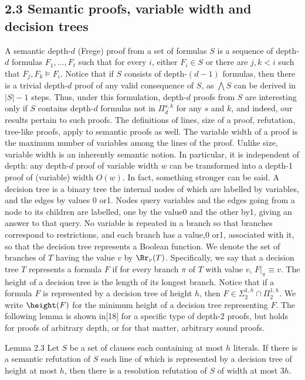 \subsection*{2.3 Semantic proofs, variable width and decision trees}
A semantic depth-$d$ (Frege) proof from a set of formulas $S$ is a sequence of depth-$d$ formulas $F_1,\ldots,F_t$ such that for every $i$, either $F_i\in S$ or there are $j,k<i$ such that $F_j,F_k\models F_i$. Notice that if $S$ consists of depth-$(d-1)$ formulas, then there is a trivial depth-$d$ proof of any valid consequence of $S$, as $\bigwedge S$ can be derived in $|S|-1$ steps. Thus, under this formulation, depth-$d$ proofs from $S$ are interesting only if $S$ contains depth-$d$ formulas not in $\Pi_d^{s,k}$ for any $s$ and $k$, and indeed, our results pertain to such proofs.
The definitions of lines, size of a proof, refutation, tree-like proofs, apply to semantic proofs as well. The variable width of a proof is the maximum number of variables among the lines of the proof.
Unlike size, variable width is an inherently semantic notion. In particular, it is independent of depth: any depth-$d$ proof of variable width $w$ can be transformed into a depth-1 proof of (variable) width $O(w)$. In fact, something stronger can be said. A decision tree is a binary tree the internal nodes of which are labelled by variables, and the edges by values 0 or1. Nodes query variables and the edges going from a node to its children are labelled, one by the value0 and the other by1, giving an answer to that query. No variable is repeated in a branch so that branches correspond to restrictions, and each branch has a value,0 or1, associated with it, so that the decision tree represents a Boolean function. We denote the set of branches of $T$ having the value $v$ by $\Br_v(T)$. Specifically, we say that a decision tree $T$ represents a formula $F$ if for every branch $\pi$ of $T$ with value $v$, $F|_\pi\equiv v$. The height of a decision tree is the length of its longest branch. Notice that if a formula $F$ is represented by a decision tree of height $h$, then $F\in\Sigma_2^{1,h}\cap\Pi_2^{1,h}$. We write $\height(F)$ for the minimum height of a decision tree representing $F$. The following lemma is shown in[18] for a specific type of depth-2 proofs, but holds for proofs of arbitrary depth, or for that matter, arbitrary sound proofs.
\begin{originalresult}{Lemma 2.3}
Let $S$ be a set of clauses each containing at most $h$ literals. If there is a semantic refutation of $S$ each line of which is represented by a decision tree of height at most $h$, then there is a resolution refutation of $S$ of width at most $3h$.
\end{originalresult}
